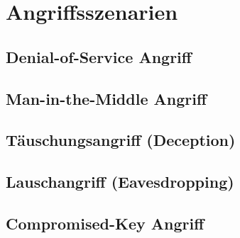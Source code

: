 
\section{Angriffsszenarien}\label{sec:angriffszenarien}
\subsection{Denial-of-Service Angriff}\label{subsec:dos}
\subsection{Man-in-the-Middle Angriff}\label{subsec:mitm}
\subsection{T\"auschungsangriff (Deception)}\label{subsec:tauschung} %
\subsection{Lauschangriff (Eavesdropping)}\label{subsec:lauschen} %
\subsection{Compromised-Key Angriff}\label{subsec:key}
